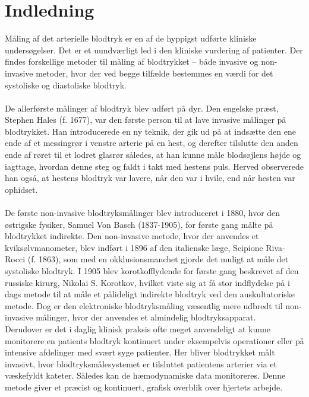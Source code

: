 \chapter{Indledning}
Måling af det arterielle blodtryk er en af de hyppigst udførte kliniske undersøgelser. Det er et uundværligt led i den kliniske vurdering af patienter. Der findes forskellige metoder til måling af blodtrykket – både invasive og non-invasive metoder, hvor der ved begge tilfælde bestemmes en værdi for det systoliske og diastoliske blodtryk. \\\\
De allerførste målinger af blodtryk blev udført på dyr. Den engelske præst, Stephen Hales (f. 1677), var den første person til at lave invasive målinger på blodtrykket. Han introducerede en ny teknik, der gik ud på at indsætte den ene ende af et messingrør i venstre arterie på en hest, og derefter tilslutte den anden ende af røret til et lodret glasrør således, at han kunne måle blodsøjlens højde og iagttage, hvordan denne steg og faldt i takt med hestens puls. Herved observerede han også, at hestens blodtryk var lavere, når den var i hvile, end når hesten var ophidset. \\\\
De første non-invasive blodtryksmålinger blev introduceret i 1880, hvor den østrigske fysiker, Samuel Von Basch (1837-1905), for første gang målte på blodtrykket indirekte. Den non-invasive metode, hvor der anvendes et kviksølvmanometer, blev indført i 1896 af den italienske læge, Scipione Riva-Rocci (f. 1863), som med en okklusionsmanchet gjorde det muligt at måle det systoliske blodtryk. I 1905 blev korotkofflydende for første gang beskrevet af den russiske kirurg, Nikolai S. Korotkov, hvilket viste sig at få stor indflydelse på i dags metode til at måle et pålideligt indirekte blodtryk ved den auskultatoriske metode. Dog er den elektroniske blodtryksmåling væsentlig mere udbredt til non-invasive målinger, hvor der anvendes et almindelig blodtryksapparat. \\
Derudover er det i daglig klinisk praksis ofte meget anvendeligt at kunne monitorere en patients blodtryk kontinuert under eksempelvis operationer eller på intensive afdelinger med svært syge patienter. Her bliver blodtrykket målt invasivt, hvor blodtryksmålesystemet er tilsluttet patientens arterier via et væskefyldt kateter. Således kan de hæmodynamiske data monitoreres. Denne metode giver et præcist og kontinuert, grafisk overblik over hjertets arbejde. \\\\
